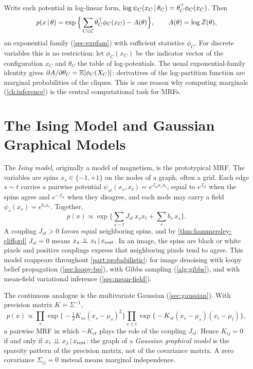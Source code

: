 \begin{remark}
Write each potential in log-linear form, $\log\psi_C(x_C\,|\,\theta_C)=\theta_C^{\top}\phi_C(x_C)$. Then
\[
p(x\,|\,\theta)=\exp\Big\{\sum_{C\in\mathcal{C}}\theta_C^{\top}\phi_C(x_C)-A(\theta)\Big\},\qquad A(\theta)=\log Z(\theta),
\]
an exponential family (\cref{sec:expfam}) with sufficient statistics $\phi_C$. For discrete variables this is no restriction: let $\phi_C(x_C)$ be the indicator vector of the configuration $x_C$ and $\theta_C$ the table of log-potentials. The usual exponential-family identity gives $\partial A/\partial\theta_C=\mathbb{E}[\phi_C(X_C)]$: derivatives of the log-partition function are marginal probabilities of the cliques. This is one reason why computing marginals (\cref{ch:inference}) is the central computational task for MRFs.
\end{remark}

\section{The Ising Model and Gaussian Graphical Models}\label{sec:ising}

The \emph{Ising model}, originally a model of magnetism, is the prototypical MRF. The variables are spins $x_s\in\{-1,+1\}$ on the nodes of a graph, often a grid. Each edge $s\sim t$ carries a pairwise potential $\psi_{st}(x_s,x_t)=e^{J_{st}x_sx_t}$, equal to $e^{J_{st}}$ when the spins agree and $e^{-J_{st}}$ when they disagree, and each node may carry a field $\psi_s(x_s)=e^{b_sx_s}$. Together,
\[
p(x)\propto\exp\Big\{\sum_{s\sim t}J_{st}\,x_sx_t+\sum_sb_s\,x_s\Big\}.
\]
A coupling $J_{st}>0$ favors equal neighboring spins, and by \cref{thm:hammersley-clifford} $J_{st}=0$ means $x_s\perp\!\!\!\perp x_t\,|\, x_{\text{rest}}$. In an image, the spins are black or white pixels and positive couplings express that neighboring pixels tend to agree. This model reappears throughout \cref{part:probabilistic}: for image denoising with loopy belief propagation (\cref{sec:loopy-bp}), with Gibbs sampling (\cref{alg:gibbs}), and with mean-field variational inference (\cref{sec:mean-field}).

The continuous analogue is the multivariate Gaussian (\cref{sec:gaussian}). With precision matrix $K=\Sigma^{-1}$,
\[
p(x)\propto\prod_s\exp\Big\{-\tfrac12K_{ss}(x_s-\mu_s)^2\Big\}\prod_{s<t}\exp\big\{-K_{st}(x_s-\mu_s)(x_t-\mu_t)\big\},
\]
a pairwise MRF in which $-K_{st}$ plays the role of the coupling $J_{st}$. Hence $K_{ij}=0$ if and only if $x_i\perp\!\!\!\perp x_j\,|\, x_{\text{rest}}$: the graph of a \emph{Gaussian graphical model} is the sparsity pattern of the precision matrix, not of the covariance matrix. A zero covariance $\Sigma_{ij}=0$ instead means marginal independence.

